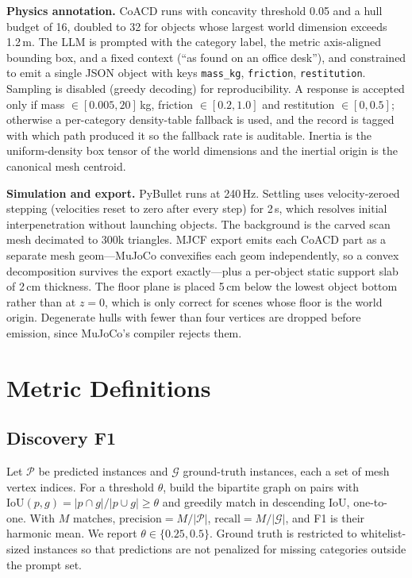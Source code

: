 \textbf{Physics annotation.} CoACD runs with concavity threshold 0.05 and
a hull budget of 16, doubled to 32 for objects whose largest world
dimension exceeds 1.2\,m. The LLM is prompted with the category label, the
metric axis-aligned bounding box, and a fixed context (``as found on an
office desk''), and constrained to emit a single JSON object with keys
\texttt{mass\_kg}, \texttt{friction}, \texttt{restitution}. Sampling is
disabled (greedy decoding) for reproducibility. A response is accepted
only if mass $\in[0.005,20]$\,kg, friction $\in[0.2,1.0]$ and restitution
$\in[0,0.5]$; otherwise a per-category density-table fallback is used, and
the record is tagged with which path produced it so the fallback rate is
auditable. Inertia is the uniform-density box tensor of the world
dimensions and the inertial origin is the canonical mesh centroid.

\textbf{Simulation and export.} PyBullet runs at 240\,Hz. Settling uses
velocity-zeroed stepping (velocities reset to zero after every step) for
2\,s, which resolves initial interpenetration without launching objects.
The background is the carved scan mesh decimated to 300k triangles. MJCF
export emits each CoACD part as a separate mesh geom---MuJoCo convexifies
each geom independently, so a convex decomposition survives the export
exactly---plus a per-object static support slab of 2\,cm thickness. The
floor plane is placed 5\,cm below the lowest object bottom rather than at
$z{=}0$, which is only correct for scenes whose floor is the world origin.
Degenerate hulls with fewer than four vertices are dropped before
emission, since MuJoCo's compiler rejects them.

\section{Metric Definitions}
\label{app:metrics}

\subsection{Discovery F1}
Let $\mathcal{P}$ be predicted instances and $\mathcal{G}$ ground-truth
instances, each a set of mesh vertex indices. For a threshold $\theta$,
build the bipartite graph on pairs with
$\mathrm{IoU}(p,g) = |p\cap g|/|p\cup g| \geq \theta$ and greedily match
in descending IoU, one-to-one. With $M$ matches,
$\mathrm{precision} = M/|\mathcal{P}|$,
$\mathrm{recall} = M/|\mathcal{G}|$, and F1 is their harmonic mean. We
report $\theta \in \{0.25, 0.5\}$. Ground truth is restricted to
whitelist-sized instances so that predictions are not penalized for
missing categories outside the prompt set.

